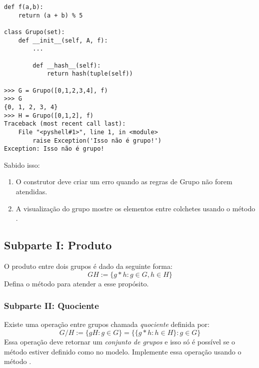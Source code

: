 \documentclass[12pt]{article}
\begin{document}
	\begin{lstlisting}
def f(a,b):
    return (a + b) % 5
    
class Grupo(set):
    def __init__(self, A, f):
        ...

	    def __hash__(self):
        	return hash(tuple(self))
        
>>> G = Grupo([0,1,2,3,4], f)
>>> G
{0, 1, 2, 3, 4}
>>> H = Grupo([0,1,2], f)
Traceback (most recent call last):
    File "<pyshell#1>", line 1, in <module>
        raise Exception('Isso não é grupo!')
Exception: Isso não é grupo!
	\end{lstlisting}
	
	Sabido isso:
	\begin{enumerate}
		\item O construtor deve criar um erro quando as regras de Grupo não forem atendidas.
		\item A visualização do grupo mostre os elementos entre colchetes usando o método .
	\end{enumerate}

	\subsection{Subparte I: Produto}
	O produto entre dois grupos é dado da seguinte forma:
	\[GH := \{g \ast h : g \in G, h\in H\} \]
	Defina o método  para atender a esse propósito.
	
	\subsubsection{Subparte II: Quociente}
	Existe uma operação entre grupos chamada \emph{quociente} definida por:
	\[G/H := \{gH : g \in G\} = \{\{g \ast h: h \in H\} : g \in G\}\]
	Essa operação deve retornar um \emph{conjunto de grupos} e isso só é possível se o método  estiver definido como no modelo. Implemente essa operação usando o método .
	
\end{document}
